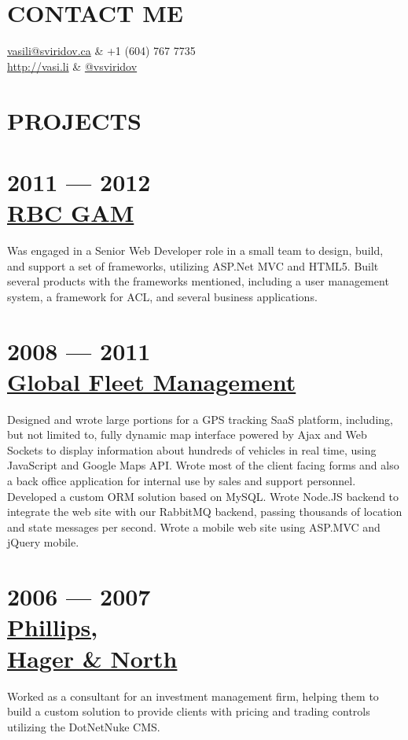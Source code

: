 \documentclass[margin]{res}
\begin{document}
  
\address{ \#304 - 6742 Station Hill Ct \\ Burnaby, BC, V3N4V2\\Canada }
\begin{resume}

\section{CONTACT ME}
	\begin{ncolumn}{2}
		\href{mailto:vasili@sviridov.ca}{vasili@sviridov.ca} & +1 (604) 767 7735 \\
		\href{http://vasi.li}{http://vasi.li} & \href{http://twitter.com/vsviridov}{@vsviridov}
	\end{ncolumn}
 
\section{PROJECTS}
	\section{2011 --- 2012\\\href{http://www.rbcgam.com/gam/}{RBC GAM}}
	Was engaged in a Senior Web Developer role in a small team to design, build, and support a set of frameworks, utilizing ASP.Net MVC and HTML5. Built several products with the frameworks mentioned, including a user management system, a framework for ACL, and several business applications.
	\section{2008 --- 2011\\\href{http://positrace.com}{Global Fleet Management}}
	 Designed and wrote large portions for a GPS tracking SaaS platform, including, but not limited to, fully dynamic map interface powered by Ajax and Web Sockets to display information about hundreds of vehicles in real time, using JavaScript and Google Maps API. Wrote most of the client facing forms and also a back office application for internal use by sales and support personnel. Developed a custom ORM solution based on MySQL. Wrote Node.JS backend to integrate the web site with our RabbitMQ backend, passing thousands of location and state messages per second. Wrote a mobile web site using ASP.MVC and jQuery mobile.
	\section{2006 --- 2007\\\href{https://wwwphn.com/}{Phillips,\\Hager \& North}}
	Worked as a consultant for an investment management firm, helping them to build a custom solution to provide clients with pricing and trading controls utilizing the DotNetNuke CMS.

\end{resume}
\end{document}
